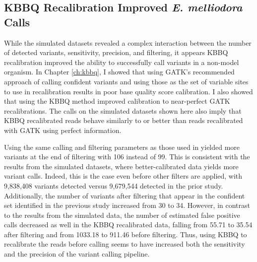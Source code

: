 

\subsection{KBBQ Recalibration Improved \textit{E. melliodora} Calls}

While the simulated datasets revealed a complex interaction between the number of detected variants, sensitivity, precision, and filtering, it appears KBBQ recalibration improved the ability to successfully call variants in a non-model organism. In Chapter \ref{ch:kbbq}, I showed that using GATK's recommended approach of calling confident variants and using those as the set of variable sites to use in recalibration results in poor base quality score calibration. I also showed that using the KBBQ method improved calibration to near-perfect GATK recalibrations. The calls on the simulated datasets shown here also imply that KBBQ recalibrated reads behave similarly to or better than reads recalibrated with GATK using perfect information.

Using the same calling and filtering parameters as those used in \cite{orr_phylogenomic_2020} yielded more variants at the end of filtering with 106 instead of 99. This is consistent with the results from the simulated datasets, where better-calibrated data yields more variant calls. Indeed, this is the case even before other filters are applied, with 9,838,408 variants detected versus 9,679,544 detected in the prior study. Additionally, the number of variants after filtering that appear in the confident set identified in the previous study increased from 30 to 34. However, in contrast to the results from the simulated data, the number of estimated false positive calls decreased as well in the KBBQ recalibrated data, falling from 55.71 to 35.54 after filtering and from 1033.18 to 911.46 before filtering. Thus, using KBBQ to recalibrate the reads before calling seems to have increased both the sensitivity and the precision of the variant calling pipeline.

